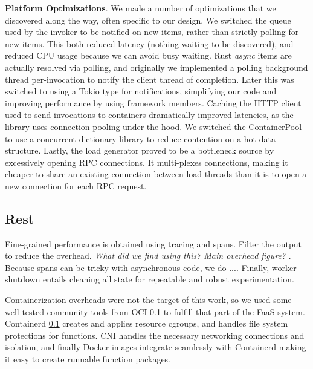 \textbf{Platform Optimizations}.
We made a number of optimizations that we discovered along the way, often specific to our design.
We switched the queue used by the invoker to be notified on new items, rather than strictly polling for new items.
This both reduced latency (nothing waiting to be discovered), and reduced CPU usage because we can avoid busy waiting.
Rust \emph{async} items are actually resolved via polling, and originally we implemented a polling background thread per-invocation to notify the client thread of completion.
Later this was switched to using a Tokio type for notifications, simplifying our code and improving performance by using framework members.
Caching the HTTP client used to send invocations to containers dramatically improved latencies, as the library uses connection pooling under the hood.
We switched the ContainerPool to use a concurrent dictionary library to reduce contention on a hot data structure.
Lastly, the load generator proved to be a bottleneck source by excessively opening RPC connections.
It multi-plexes connections, making it cheaper to share an existing connection between load threads than it is to open a new connection for each RPC request.



\subsection{Rest} 



Fine-grained performance is obtained using tracing and spans. Filter the output to reduce the overhead. \emph{What did we find using this? Main overhead figure?} . Because spans can be tricky with asynchronous code, we do ....
Finally, worker shutdown entails cleaning all state for repeatable and robust experimentation. 


Containerization overheads were not the target of this work, so we used some well-tested community tools from OCI \ref{} to fulfill that part of the FaaS system.
Containerd \ref{} creates and applies resource cgroups, and handles file system protections for functions.
CNI handles the necessary networking connections and isolation, and finally Docker images integrate seamlessly with Containerd making it easy to create runnable function packages.

